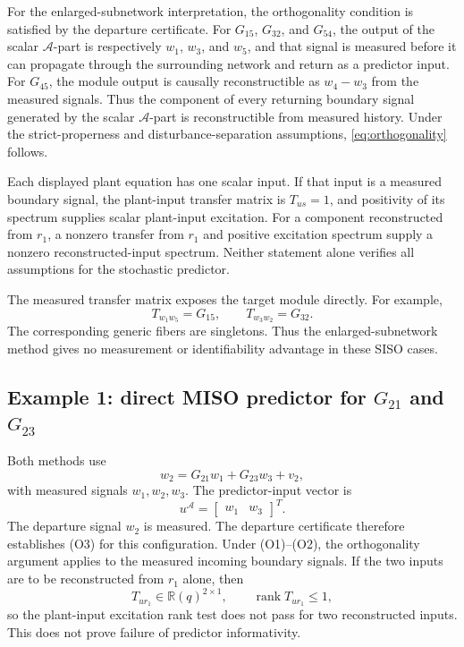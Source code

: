 \documentclass[11pt,a4paper]{article}
\newcommand{\rank}{\operatorname{rank}}
\newcommand{\Aset}{\mathcal A}
\begin{document}
For the enlarged-subnetwork interpretation, the orthogonality condition is satisfied by the departure certificate.  For $G_{15}$, $G_{32}$, and $G_{54}$, the output of the scalar $\Aset$-part is respectively $w_1$, $w_3$, and $w_5$, and that signal is measured before it can propagate through the surrounding network and return as a predictor input.  For $G_{45}$, the module output is causally reconstructible as $w_4-w_3$ from the measured signals.  Thus the component of every returning boundary signal generated by the scalar $\Aset$-part is reconstructible from measured history.  Under the strict-properness and disturbance-separation assumptions, \eqref{eq:orthogonality} follows.

Each displayed plant equation has one scalar input.  If that input is a measured boundary signal, the plant-input transfer matrix is $T_{us}=1$, and positivity of its spectrum supplies scalar plant-input excitation.  For a component reconstructed from $r_1$, a nonzero transfer from $r_1$ and positive excitation spectrum supply a nonzero reconstructed-input spectrum.  Neither statement alone verifies all assumptions for the stochastic predictor.

The measured transfer matrix exposes the target module directly.  For example,
\[
  T_{w_1w_5}=G_{15},
  \qquad
  T_{w_3w_2}=G_{32}.
\]
The corresponding generic fibers are singletons.  Thus the enlarged-subnetwork method gives no measurement or identifiability advantage in these SISO cases.

\subsection{Example 1: direct MISO predictor for $G_{21}$ and $G_{23}$}

Both methods use
\begin{equation}
  w_2=G_{21}w_1+G_{23}w_3+v_2,
  \label{eq:vdh-miso}
\end{equation}
with measured signals $w_1,w_2,w_3$.  The predictor-input vector is
\[
  u^{\Aset}=\begin{bmatrix}w_1&w_3\end{bmatrix}^{\!T}.
\]
The departure signal $w_2$ is measured.  The departure certificate therefore establishes (O3) for this configuration.  Under (O1)--(O2), the orthogonality argument applies to the measured incoming boundary signals.
If the two inputs are to be reconstructed from $r_1$ alone, then
\[
  T_{u r_1}\in\mathbb R(q)^{2\times 1},
  \qquad
  \rank T_{u r_1}\leq 1,
\]
so the plant-input excitation rank test does not pass for two reconstructed inputs.  This does not prove failure of predictor informativity.
\end{document}
